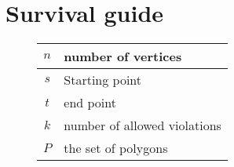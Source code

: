 \chapter{Survival guide}

\begin{figure}
\begin{center}
\begin{tabular}{| c | l |}
	\hline
	$n$ & number of vertices \\
	\hline
	$s$ & Starting point \\
	\hline
	$t$ & end point \\
	\hline
	$k$ & number of allowed violations \\
	\hline
	$P$ & the set of polygons \\
	\hline
\end{tabular}
\end{center}
\end{figure}
